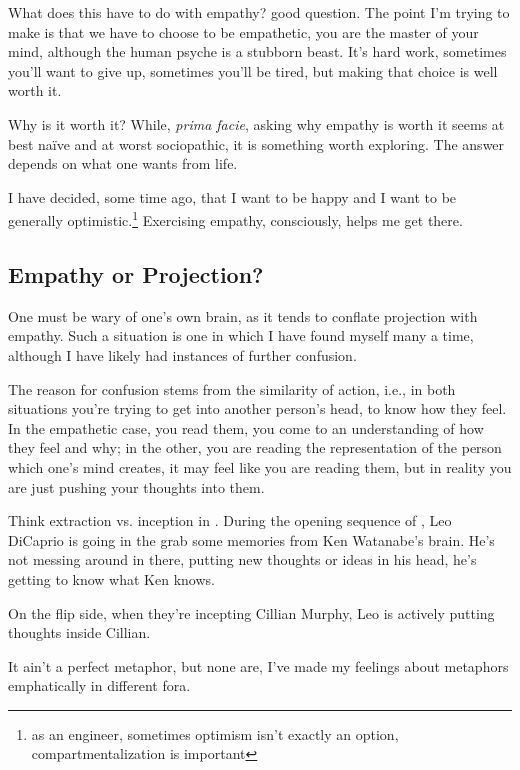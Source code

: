 \documentclass[../butidigress.tex]{subfiles}
\begin{document}
What does this have to do with empathy? good question.
The point I'm trying to make is that we have to choose to be empathetic, you are the master of your mind, although the human psyche is a stubborn beast.
It's hard work, sometimes you'll want to give up, sometimes you'll be tired, but making that choice is well worth it.

Why is it worth it?
While, \textit{prima facie}, asking why empathy is worth it seems at best na\"ive and at worst sociopathic, it is something worth exploring.
The answer depends on what one wants from life.

I have decided, some time ago, that I want to be happy and I want to be generally optimistic.\footnote{as an engineer, sometimes optimism isn't exactly an option, compartmentalization is important}
Exercising empathy, consciously, helps me get there.

\subsection{Empathy or Projection?}
One must be wary of one's own brain, as it tends to conflate projection with empathy.
Such a situation is one in which I have found myself many a time, although I have likely had instances of further confusion.

The reason for confusion stems from the similarity of action, i.e., in both situations you're trying to get into another person's head, to know how they feel.
In the empathetic case, you read them, you come to an understanding of how they feel and why; in the other, you are reading the representation of the person which one's mind creates, it may feel like you are reading them, but in reality you are just pushing your thoughts into them.

Think extraction vs. inception in .
During the opening sequence of , Leo DiCaprio is going in the grab some memories from Ken Watanabe's brain.
He's not messing around in there, putting new thoughts or ideas in his head, he's getting to know what Ken knows.

On the flip side, when they're incepting Cillian Murphy, Leo is actively putting thoughts inside Cillian.

It ain't a perfect metaphor, but none are, I've made my feelings about metaphors emphatically in different fora.
\end{document}
